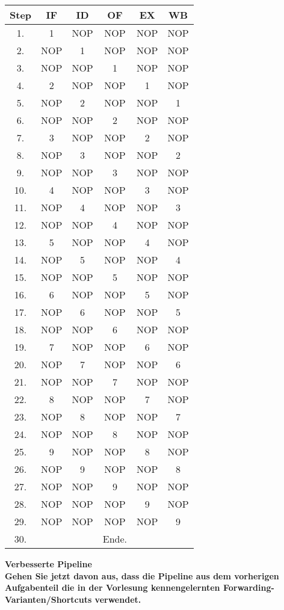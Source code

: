 \documentclass[11pt]{article}
\newcommand{\aufgabe}[1]{\item{\bf #1}}
\begin{document}
\begin{center}
\begin{tabular}{c|c|c|c|c|c}
    Step & IF & ID & OF & EX & WB \\
    \hline
    1. & 1 & NOP & NOP & NOP & NOP \\
    2. & NOP & 1 & NOP & NOP & NOP \\
    3. & NOP & NOP & 1 & NOP & NOP \\
    4. & 2 & NOP & NOP & 1 & NOP \\
    5. & NOP & 2 & NOP & NOP & 1 \\
    6. & NOP & NOP & 2 & NOP & NOP \\
    7. & 3 & NOP & NOP & 2 & NOP \\
    8. & NOP & 3 & NOP & NOP & 2\\
    9. & NOP & NOP & 3 & NOP & NOP \\
    10. & 4 & NOP & NOP & 3 & NOP \\
    11. & NOP & 4 & NOP & NOP & 3 \\
    12. & NOP & NOP & 4 & NOP & NOP \\
    13. & 5 & NOP & NOP & 4 & NOP \\
    14. & NOP & 5 & NOP & NOP & 4 \\
    15. & NOP & NOP & 5 & NOP & NOP \\
    16. & 6 & NOP & NOP & 5 & NOP \\
    17. & NOP & 6 & NOP & NOP & 5 \\
    18. & NOP & NOP & 6 & NOP & NOP \\
    19. & 7 & NOP & NOP & 6 & NOP \\
    20. & NOP & 7 & NOP & NOP & 6 \\
    21. & NOP & NOP & 7 & NOP & NOP \\
    22. & 8 & NOP & NOP & 7 & NOP \\
    23. & NOP & 8 & NOP & NOP & 7 \\
    24. & NOP & NOP & 8 & NOP & NOP \\
    25. & 9 & NOP & NOP & 8 & NOP \\
    26. & NOP & 9 & NOP & NOP & 8 \\
    27. & NOP & NOP & 9 & NOP & NOP \\
    28. & NOP & NOP & NOP & 9 & NOP \\
    29. & NOP & NOP & NOP & NOP & 9 \\
    30. &  &  & Ende. &  & 
\end{tabular}
\end{center}
\aufgabe{Verbesserte Pipeline \\ Gehen Sie jetzt davon aus, dass die Pipeline aus dem vorherigen Aufgabenteil die in der Vorlesung kennengelernten Forwarding-Varianten/Shortcuts verwendet.}
\end{document}
